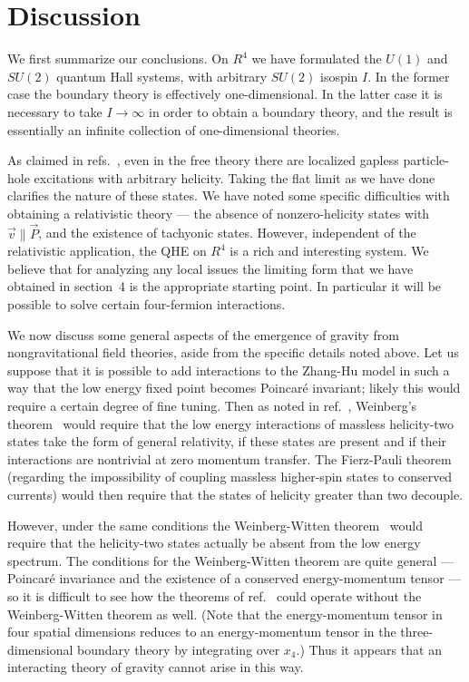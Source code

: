 \documentclass[a4paper,12pt]{article}
\newcommand{\R}{R}
\begin{document}
\section{Discussion}

We first summarize our conclusions.  On $\R^4$ we have formulated the $U(1)$
and $SU(2)$ quantum Hall systems, with arbitrary $SU(2)$ isospin $I$.  In
the former case the boundary theory is effectively one-dimensional.  In the
latter case it is necessary to take $I \to \infty$ in order to obtain a
boundary theory, and the result is essentially an infinite collection of
one-dimensional theories.

As claimed in refs.~\cite{hz1,hz2}, even in the free theory there are
localized gapless particle-hole excitations with arbitrary helicity.  Taking
the flat limit as we have done clarifies the nature of these states.  We have
noted some specific difficulties with obtaining a relativistic theory --- the
absence of nonzero-helicity states with $\vec v
\parallel \vec P$, and the existence of tachyonic states.  However, independent
of the relativistic application, the QHE on
$\R^4$ is a rich and interesting system.  We believe that for analyzing
any local issues the limiting form that we have obtained in section~4 is the
appropriate starting point.  In particular it will be possible to solve 
certain four-fermion interactions.

We now discuss some general aspects of the emergence of gravity from
nongravitational field theories, aside from the specific details noted above. 
Let us suppose that it is possible to add interactions to the Zhang-Hu model in
such a way that the low energy fixed point becomes Poincar\'e invariant;
likely this would require a certain degree of fine tuning.  Then as noted in
ref.~\cite{hz1}, Weinberg's theorem~\cite{weinberg} would require that the low
energy interactions of massless helicity-two states take
the form of general relativity,
if these states are present and if their interactions are nontrivial  at zero
momentum transfer. The Fierz-Pauli theorem~\cite{paulifierz} (regarding the
impossibility of coupling massless higher-spin states to conserved currents)
would then require that the states of helicity greater than two decouple.

However, under the same conditions the Weinberg-Witten theorem~\cite{weinwit}
would require that the helicity-two states actually be absent from the low
energy spectrum.  The conditions for the Weinberg-Witten theorem are quite
general --- Poincar\'e invariance and the existence of a conserved
energy-momentum tensor --- so it is difficult to see how the theorems of
ref.~\cite{weinberg} could operate without the Weinberg-Witten theorem as
well.  (Note that the energy-momentum tensor in four spatial dimensions
reduces to an energy-momentum tensor in the three-dimensional boundary theory
by integrating over $x_4$.)  Thus it appears that an interacting theory of
gravity cannot arise in this way.
\end{document}
